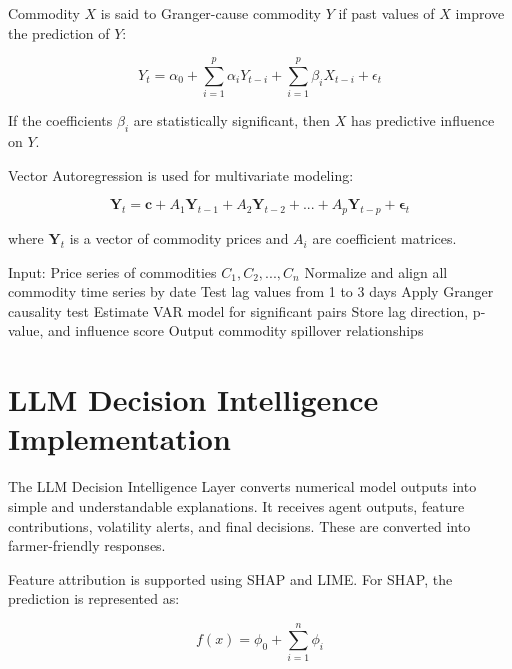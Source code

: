 \documentclass[12pt,a4paper]{report}
\begin{document}
Commodity $X$ is said to Granger-cause commodity $Y$ if past values of $X$ improve the prediction of $Y$:

\begin{equation}
Y_t = \alpha_0 + \sum_{i=1}^{p} \alpha_i Y_{t-i} + \sum_{i=1}^{p} \beta_i X_{t-i} + \epsilon_t
\end{equation}

If the coefficients $\beta_i$ are statistically significant, then $X$ has predictive influence on $Y$.

Vector Autoregression is used for multivariate modeling:

\begin{equation}
\mathbf{Y}_t = \mathbf{c} + A_1\mathbf{Y}_{t-1} + A_2\mathbf{Y}_{t-2} + ... + A_p\mathbf{Y}_{t-p} + \mathbf{\epsilon}_t
\end{equation}

where $\mathbf{Y}_t$ is a vector of commodity prices and $A_i$ are coefficient matrices.

\begin{algorithm}[H]
\caption{Cross-Commodity Lag Detection}
\begin{algorithmic}[1]
\State Input: Price series of commodities $C_1, C_2, ..., C_n$
\State Normalize and align all commodity time series by date
    \State Test lag values from 1 to 3 days
    \State Apply Granger causality test
    \State Estimate VAR model for significant pairs
    \State Store lag direction, p-value, and influence score
\EndFor
\State Output commodity spillover relationships
\end{algorithmic}
\end{algorithm}

\section{LLM Decision Intelligence Implementation}

The LLM Decision Intelligence Layer converts numerical model outputs into simple and understandable explanations. It receives agent outputs, feature contributions, volatility alerts, and final decisions. These are converted into farmer-friendly responses.

Feature attribution is supported using SHAP and LIME. For SHAP, the prediction is represented as:

\begin{equation}
f(x) = \phi_0 + \sum_{i=1}^{n} \phi_i
\end{equation}
\end{document}
